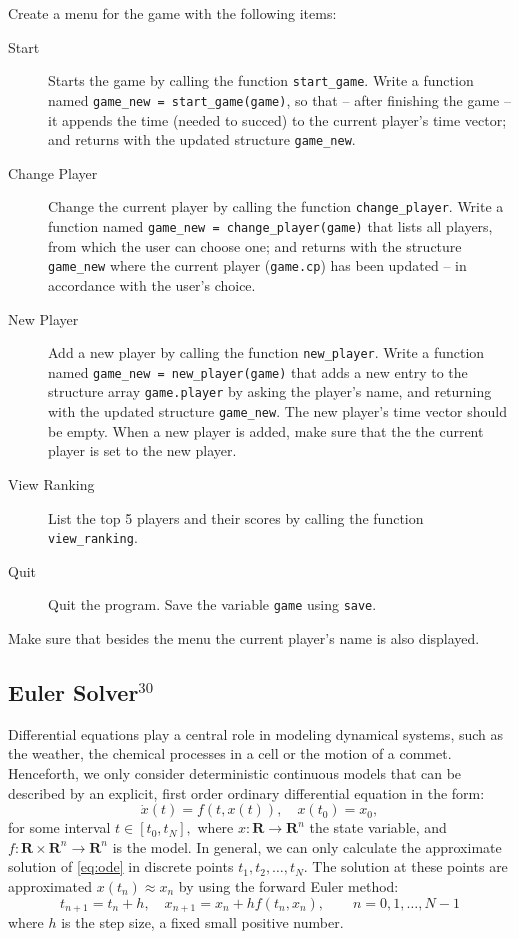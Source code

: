 \documentclass[a4paper, fleqn, 10pt]{report}
\theoremstyle{definition}
\newcommand{\R}{\mathbf{R}}
\newcommand{\mc}[1]{{\color{Blue}\tt #1}}
\newcommand{\mck}[1]{{\tt#1}}
\begin{document}
Create a menu for the game with the following items:
\begin{description}
\item[Start] 
    Starts the game by calling the function \mc{start\_game}.
    Write a function named \mck{game\_new =}\mc{ start\_game}\mck{(game)}, so that -- after finishing the game --
    it appends the time (needed to succed) to the current player's time vector; and returns with the updated structure \mck{game\_new}.
\item[Change Player]
    Change the current player by calling the function \mc{change\_player}.
    Write a function named \mck{game\_new = }\mc{change\_player}\mck{(game)} that
    lists all players, from which the user can choose one; and returns with the structure \mck{game\_new}
    where the current player (\mck{game.cp}) has been updated -- in accordance with the user's choice.
\item[New Player]
    Add a new player by calling the function \mc{new\_player}. Write a function named \mck{game\_new = }\mc{new\_player}\mck{(game)} that adds a new entry to the structure array \mck{game.player} by asking the player's name,
    and returning with the updated structure \mck{game\_new}.
    The new player's  time vector should be empty. When a new player is added, make sure that the the current player is set to the new player.
\item[View Ranking]
    List the top 5 players and their scores by calling the function \mc{view\_ranking}.
\item[Quit]
    Quit the program. Save the variable \mck{game} using \mc{save}.
\end{description}
Make sure that besides the menu the current player's name is also displayed.

\subsection*{Euler Solver$^{30}$}
Differential equations play a central role in modeling dynamical systems, such as the weather,
the chemical processes in a cell or the motion of a commet.
Henceforth, we only consider deterministic continuous models that can be described by
an explicit, first order ordinary differential equation in the form:
\begin{equation}
\dot x(t) = f(t,x(t)),\quad x(t_0) = x_0,\label{eq:ode} 
\end{equation}
for some interval $t\in [t_0, t_N],$
where $x\colon \R\to\R^n$ the state variable, and $f\colon\R\times\R^n\to\R^n$ is the model.
In general, we can only calculate the approximate solution of \eqref{eq:ode} in discrete points $t_1,t_2,\dots,t_N.$
The solution at these points are approximated $x(t_n)\approx x_n$ by using the forward Euler method:
\[t_{n+1} = t_n + h, \quad x_{n+1} = x_n + h f(t_n, x_n), \qquad n=0,1,\dots,N-1\]
where $h$ is the step size, a fixed small positive number.
\end{document}
